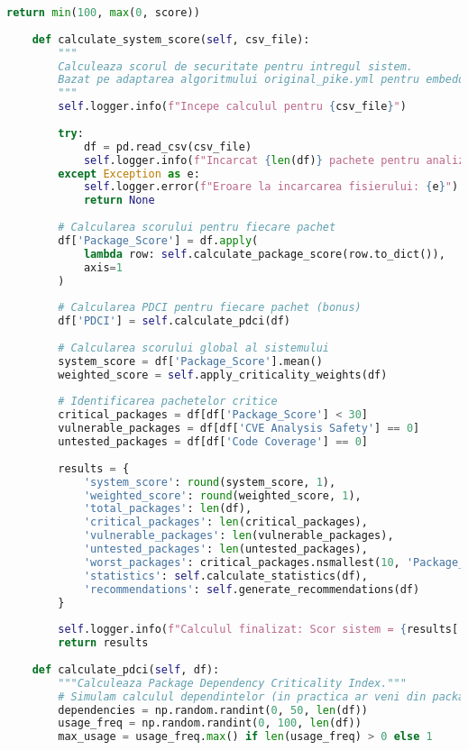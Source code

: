 \documentclass[12pt,a4paper]{article}
\begin{document}
\begin{lstlisting}[language=Python, caption=Script pentru calcularea scorului de securitate, label=lst:security_calculator]
        return min(100, max(0, score))
    
    def calculate_system_score(self, csv_file):
        """
        Calculeaza scorul de securitate pentru intregul sistem.
        Bazat pe adaptarea algoritmului original_pike.yml pentru embedded security.
        """
        self.logger.info(f"Incepe calculul pentru {csv_file}")
        
        try:
            df = pd.read_csv(csv_file)
            self.logger.info(f"Incarcat {len(df)} pachete pentru analiza")
        except Exception as e:
            self.logger.error(f"Eroare la incarcarea fisierului: {e}")
            return None
        
        # Calcularea scorului pentru fiecare pachet
        df['Package_Score'] = df.apply(
            lambda row: self.calculate_package_score(row.to_dict()), 
            axis=1
        )
        
        # Calcularea PDCI pentru fiecare pachet (bonus)
        df['PDCI'] = self.calculate_pdci(df)
        
        # Calcularea scorului global al sistemului
        system_score = df['Package_Score'].mean()
        weighted_score = self.apply_criticality_weights(df)
        
        # Identificarea pachetelor critice
        critical_packages = df[df['Package_Score'] < 30]
        vulnerable_packages = df[df['CVE Analysis Safety'] == 0]
        untested_packages = df[df['Code Coverage'] == 0]
        
        results = {
            'system_score': round(system_score, 1),
            'weighted_score': round(weighted_score, 1),
            'total_packages': len(df),
            'critical_packages': len(critical_packages),
            'vulnerable_packages': len(vulnerable_packages),
            'untested_packages': len(untested_packages),
            'worst_packages': critical_packages.nsmallest(10, 'Package_Score'),
            'statistics': self.calculate_statistics(df),
            'recommendations': self.generate_recommendations(df)
        }
        
        self.logger.info(f"Calculul finalizat: Scor sistem = {results['system_score']}")
        return results
    
    def calculate_pdci(self, df):
        """Calculeaza Package Dependency Criticality Index."""
        # Simulam calculul dependintelor (in practica ar veni din package manager)
        dependencies = np.random.randint(0, 50, len(df))
        usage_freq = np.random.randint(0, 100, len(df))
        max_usage = usage_freq.max() if len(usage_freq) > 0 else 1
        

\end{lstlisting}
\end{document}
